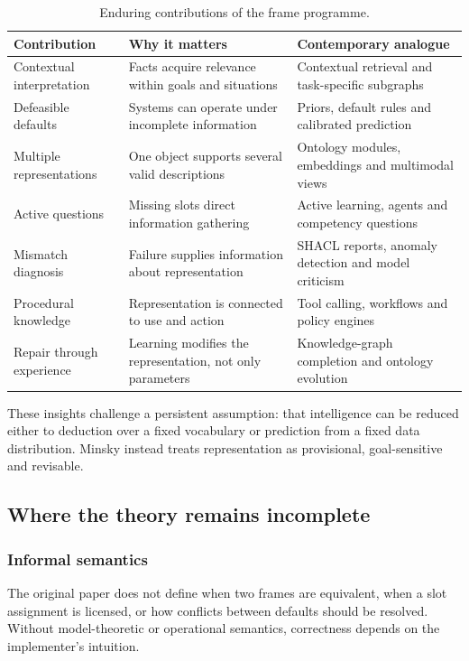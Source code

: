 \documentclass[11pt,a4paper]{article}
\begin{document}
\begin{table}[ht]
\centering
\caption{Enduring contributions of the frame programme.}
\label{tab:enduring}
\begin{tabularx}{\textwidth}{p{}YY}
\toprule
\textbf{Contribution} & \textbf{Why it matters} & \textbf{Contemporary analogue} \\
\midrule
Contextual interpretation & Facts acquire relevance within goals and situations & Contextual retrieval and task-specific subgraphs \\
Defeasible defaults & Systems can operate under incomplete information & Priors, default rules and calibrated prediction \\
Multiple representations & One object supports several valid descriptions & Ontology modules, embeddings and multimodal views \\
Active questions & Missing slots direct information gathering & Active learning, agents and competency questions \\
Mismatch diagnosis & Failure supplies information about representation & SHACL reports, anomaly detection and model criticism \\
Procedural knowledge & Representation is connected to use and action & Tool calling, workflows and policy engines \\
Repair through experience & Learning modifies the representation, not only parameters & Knowledge-graph completion and ontology evolution \\
\bottomrule
\end{tabularx}
\end{table}

These insights challenge a persistent assumption: that intelligence can be
reduced either to deduction over a fixed vocabulary or prediction from a fixed
data distribution. Minsky instead treats representation as provisional,
goal-sensitive and revisable.

\subsection{Where the theory remains incomplete}

\subsubsection{Informal semantics}

The original paper does not define when two frames are equivalent, when a slot
assignment is licensed, or how conflicts between defaults should be resolved.
Without model-theoretic or operational semantics, correctness depends on the
implementer's intuition.
\end{document}
